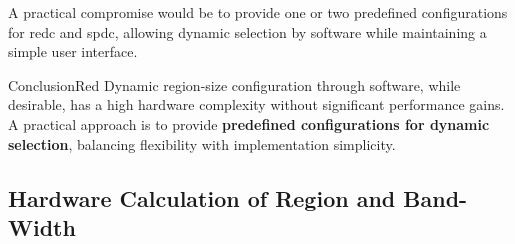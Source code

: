 A practical compromise would be to provide one or two predefined configurations for \acrshort{redc} and \acrshort{spdc}, allowing dynamic selection by software while maintaining a simple user interface.

\begin{highlight}{Conclusion}{Red}
    Dynamic region-size configuration through software, while desirable, has a high hardware complexity without significant performance gains.
    A practical approach is to provide \textbf{predefined configurations for dynamic selection}, balancing flexibility with implementation simplicity.
\end{highlight}

\subsection{Hardware Calculation of Region and Band-Width}
\label{sec:optim:rtloptims:regionInHW}

